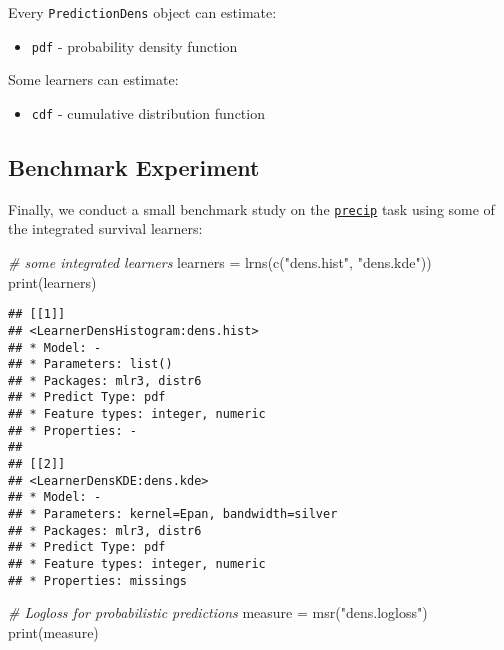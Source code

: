 \documentclass[
]{scrbook}
\newenvironment{Shaded}{\begin{snugshade}}{\end{snugshade}}
\newcommand{\CommentTok}[1]{\textcolor[rgb]{0.56,0.35,0.01}{\textit{#1}}}
\newcommand{\FunctionTok}[1]{\textcolor[rgb]{0.00,0.00,0.00}{#1}}
\newcommand{\NormalTok}[1]{#1}
\newcommand{\OtherTok}[1]{\textcolor[rgb]{0.56,0.35,0.01}{#1}}
\newcommand{\StringTok}[1]{\textcolor[rgb]{0.31,0.60,0.02}{#1}}
\providecommand{\tightlist}{%
  \setlength{\itemsep}{0pt}\setlength{\parskip}{0pt}}
\renewenvironment{Shaded} {\begin{snugshade}\small} {\end{snugshade}}
\begin{document}
Every \texttt{PredictionDens} object can estimate:

\begin{itemize}
\tightlist
\item
  \texttt{pdf} - probability density function
\end{itemize}

Some learners can estimate:

\begin{itemize}
\tightlist
\item
  \texttt{cdf} - cumulative distribution function
\end{itemize}

\hypertarget{benchmark-experiment-1}{%
\subsection{Benchmark Experiment}\label{benchmark-experiment-1}}

Finally, we conduct a small benchmark study on the \href{https://mlr3proba.mlr-org.com/reference/mlr_tasks_precip.html}{\texttt{precip}} task using some of the integrated survival learners:

\begin{Shaded}
\begin{Highlighting}[]
\CommentTok{\# some integrated learners}
\NormalTok{learners }\OtherTok{=} \FunctionTok{lrns}\NormalTok{(}\FunctionTok{c}\NormalTok{(}\StringTok{"dens.hist"}\NormalTok{, }\StringTok{"dens.kde"}\NormalTok{))}
\FunctionTok{print}\NormalTok{(learners)}
\end{Highlighting}
\end{Shaded}

\begin{verbatim}
## [[1]]
## <LearnerDensHistogram:dens.hist>
## * Model: -
## * Parameters: list()
## * Packages: mlr3, distr6
## * Predict Type: pdf
## * Feature types: integer, numeric
## * Properties: -
## 
## [[2]]
## <LearnerDensKDE:dens.kde>
## * Model: -
## * Parameters: kernel=Epan, bandwidth=silver
## * Packages: mlr3, distr6
## * Predict Type: pdf
## * Feature types: integer, numeric
## * Properties: missings
\end{verbatim}

\begin{Shaded}
\begin{Highlighting}[]
\CommentTok{\# Logloss for probabilistic predictions}
\NormalTok{measure }\OtherTok{=} \FunctionTok{msr}\NormalTok{(}\StringTok{"dens.logloss"}\NormalTok{)}
\FunctionTok{print}\NormalTok{(measure)}
\end{Highlighting}
\end{Shaded}
\end{document}

